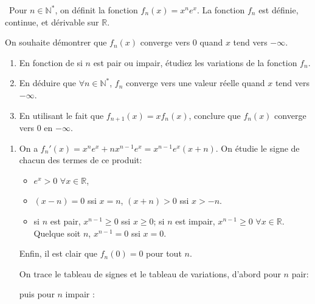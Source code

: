 \documentclass[a4paper,12pt]{exam}
\begin{document}
\begin{questions}

\question\ 
Pour $n\in\mathbb N^*$, on définit la fonction $f_n(x)=x^n e^x$. La fonction $f_n$ est définie, continue, et dérivable sur $\mathbb R$.

On souhaite démontrer que $f_n(x)$ converge vers 0 quand $x$ tend vers $-\infty$.

\begin{enumerate}
 \item En fonction de si $n$ est pair ou impair, étudiez les variations de la fonction $f_n$.
 \item En déduire que $\forall n\in\mathbb N^*$, $f_n$ converge vers une valeur réelle quand $x$ tend vers $-\infty$.
 \item En utilisant le fait que $f_{n+1}(x)=xf_n(x)$, conclure que $f_n(x)$ converge vers 0 en $-\infty$.
\end{enumerate}

\begin{solution}
 \begin{enumerate}
  \item On a $f_n'(x)=x^n e^x+nx^{n-1}e^x=x^{n-1}e^x(x+n)$. On étudie le signe de chacun des termes de ce produit:
  \begin{itemize}
   \item $e^x>0$ $\forall x\in\mathbb R$,
   \item $(x-n)=0$ ssi $x=n$, $(x+n)>0$ ssi $x>-n$.
   \item si $n$ est pair, $x^{n-1}\geqslant 0$ ssi $x\geqslant 0$; si $n$ est impair, $x^{n-1}\geqslant 0$ $\forall x\in\mathbb R$. Quelque soit $n$, $x^{n-1}=0$ ssi $x=0$.
  \end{itemize}
  
  Enfin, il est clair que $f_n(0)=0$ pour tout $n$.
  
  On trace le tableau de signes et le tableau de variations, d'abord pour $n$ pair:
  \begin{center}
\end{center}
puis pour $n$ impair :


\end{enumerate}
\end{solution}
\end{questions}
\end{document}
